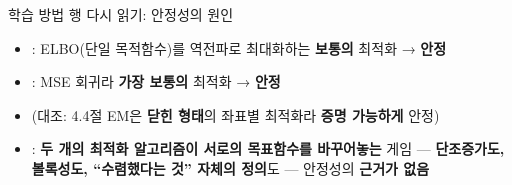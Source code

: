 \begin{frame}{학습 방법 행 다시 읽기: 안정성의 원인}
  \begin{itemize}
    \item {}: ELBO(단일 목적함수)를 역전파로 최대화하는
      \textbf{보통의} 최적화 → \textbf{안정}
    \item {}: MSE 회귀라 \textbf{가장 보통의} 최적화 →
      \textbf{안정}
    \item (대조: 4.4절 EM은 \textbf{닫힌 형태}의 좌표별 최적화라
      \textbf{증명 가능하게} 안정)
    \item {}: \textbf{두 개의 최적화 알고리즘이 서로의
      목표함수를 바꾸어놓는} 게임 — \textbf{단조증가도, 볼록성도,
      ``수렴했다는 것'' 자체의 정의}도 — 안정성의 \textbf{근거가
      없음}
  \end{itemize}
\end{frame}
